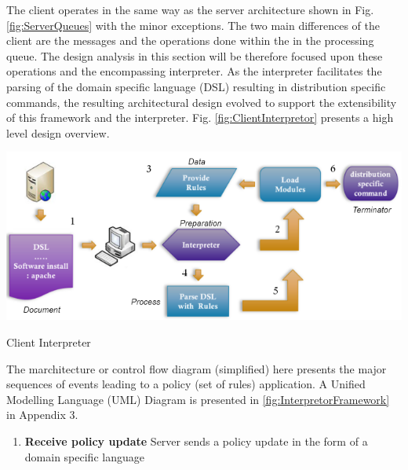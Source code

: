 		\normalsize
		{
			The client operates in the same way as the server architecture shown in Fig. \ref{fig:ServerQueues} with the minor exceptions.
			The two main differences of the client are the messages and the operations done within the in the processing queue.
			The design analysis in this section will be therefore focused upon these operations and the encompassing interpreter.  
			As the interpreter facilitates the parsing of the domain specific language (DSL) resulting in distribution specific commands, 
			the resulting architectural design evolved to support the extensibility of this framework and the interpreter.
			Fig. \ref{fig:ClientInterpretor} presents a high level design overview. 
			\newline

			\noindent\begin{minipage}{\textwidth}

				\begin{figurehere}
				\centering
				\includegraphics[scale=0.9]{pages/chapter3/figures/cleintmarchitecture.png}
				\caption{Client Interpreter}
				\label{fig:ClientInterpretor}
				\end{figurehere}	

			\end{minipage}
			
			\vspace{5mm}
			The marchitecture or control flow diagram (simplified) here presents the major sequences of events
			leading to a policy (set of rules) application.  A Unified Modelling Language (UML) Diagram is presented in 
			\ref{fig:InterpretorFramework} in Appendix 3.  
			
			\vspace{-3mm}
			\begin{multicols}{2}
			
				\begin{enumerate}
			
					\item \textbf{Receive policy update}	
						\newline								
						Server sends a policy update in the form of a domain specific language 
					

\end{enumerate}
\end{multicols}}
